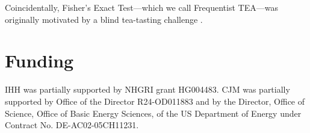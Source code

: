 Coincidentally, Fisher's Exact Test---which we call Frequentist TEA---was originally motivated by a blind tea-tasting challenge \citep{Fisher1935}.

\section*{Funding}

IHH was partially supported by NHGRI grant HG004483.
CJM was partially supported by Office of the Director R24-OD011883 and by the Director, Office of Science, Office of Basic Energy Sciences, of the US Department of Energy under Contract No. DE-AC02-05CH11231.


%
%
%
%
%
%
%
%



